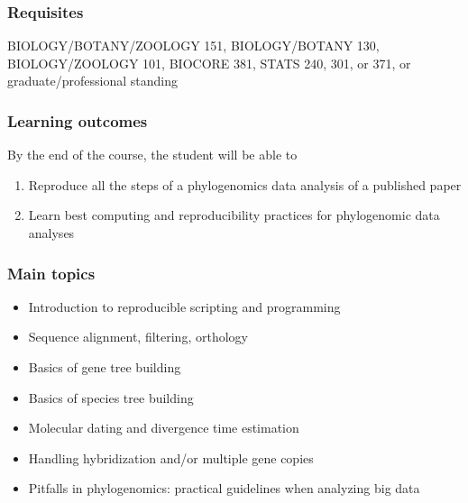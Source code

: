 \documentclass{article}
\begin{document}
\subsubsection*{Requisites}
BIOLOGY/BOTANY/ZOOLOGY 151, BIOLOGY/BOTANY 130, BIOLOGY/ZOOLOGY 101, BIOCORE 381, STATS 240, 301, or 371, or graduate/professional standing


\subsubsection*{Learning outcomes}

By the end of the course, the student will be able to

\begin{enumerate}
    \item Reproduce all the steps of a phylogenomics data analysis of a published paper
    \item Learn best computing and reproducibility practices for phylogenomic data analyses
\end{enumerate}


\subsubsection*{Main topics}
\begin{itemize}
    \item Introduction to reproducible scripting and programming
    \item Sequence alignment, filtering, orthology
    \item Basics of gene tree building
    \item Basics of species tree building
    \item Molecular dating and divergence time estimation
    \item Handling hybridization and/or multiple gene copies
    \item Pitfalls in phylogenomics: practical guidelines when analyzing big data
\end{itemize}
\end{document}

